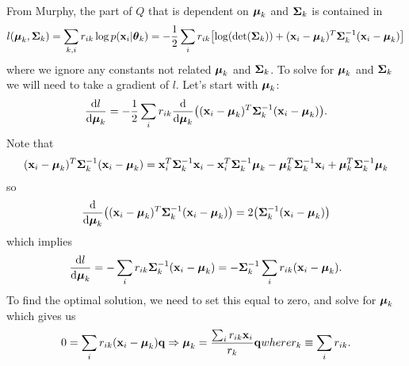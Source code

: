 \documentclass[12pt,letterpaper,fleqn]{hmcpset}
\begin{document}
\begin{solution}
From Murphy, the part of $Q$ that is dependent on $\hbox{\boldmath$\mu$}_k$ and $\hbox{\boldmath$\Sigma$}_k$ is contained in 
\begin{align*}
l(\hbox{\boldmath$\mu$}_k, \hbox{\boldmath$\Sigma$}_k) = \sum_{k,i} r_{ik} \log p(\vb x_i | \hbox{\boldmath$\theta$}_k) = -\frac12 \sum_i r_{ik}\qty[\log({\hbox{det}} (\hbox{\boldmath$\Sigma$}_k) )+ (\vb x_i - \hbox{\boldmath$\mu$}_k)^T \hbox{\boldmath$\Sigma$}^{-1}_k (\vb x_i - \hbox{\boldmath$\mu$}_k)]
\end{align*}
where we ignore any constants not related $\hbox{\boldmath$\mu$}_k$ and $\hbox{\boldmath$\Sigma$}_k$. To solve for $\hbox{\boldmath$\mu$}_k$ and $\hbox{\boldmath$\Sigma$}_k$ we will need to take a gradient of $l$. Let's start with $\hbox{\boldmath$\mu$}_k$:
\begin{align*}
\dv{l}{\hbox{\boldmath$\mu$}_k} = -\frac12 \sum_i r_{ik} \dv{\hbox{\boldmath$\mu$}_k}\qty((\vb x_i - \hbox{\boldmath$\mu$}_k)^T \hbox{\boldmath$\Sigma$}^{-1}_k (\vb x_i - \hbox{\boldmath$\mu$}_k)).
\end{align*}
Note that 
\begin{align*}
(\vb x_i - \hbox{\boldmath$\mu$}_k)^T \hbox{\boldmath$\Sigma$}^{-1}_k (\vb x_i - \hbox{\boldmath$\mu$}_k) =  \vb x_i^T \hbox{\boldmath$\Sigma$}^{-1}_k \vb x_i - \vb x_i^T \hbox{\boldmath$\Sigma$}^{-1}_k \hbox{\boldmath$\mu$}_k - \hbox{\boldmath$\mu$}_k^T \hbox{\boldmath$\Sigma$}^{-1}_k \vb x_i + \hbox{\boldmath$\mu$}_k^T \hbox{\boldmath$\Sigma$}^{-1}_k \hbox{\boldmath$\mu$}_k
\end{align*}
so
\begin{align*}
\dv{\hbox{\boldmath$\mu$}_k}\qty((\vb x_i - \hbox{\boldmath$\mu$}_k)^T \hbox{\boldmath$\Sigma$}^{-1}_k (\vb x_i - \hbox{\boldmath$\mu$}_k)) =  2 \qty(\hbox{\boldmath$\Sigma$}_k^{-1}(\vb x_i - \hbox{\boldmath$\mu$}_k))
\end{align*}
which implies
\begin{align*}
\dv{l}{\hbox{\boldmath$\mu$}_k} = - \sum_i r_{ik} \hbox{\boldmath$\Sigma$}_k^{-1}(\vb x_i - \hbox{\boldmath$\mu$}_k) = - \hbox{\boldmath$\Sigma$}_k^{-1} \sum_i r_{ik} (\vb x_i - \hbox{\boldmath$\mu$}_k).
\end{align*}
To find the optimal solution, we need to set this equal to zero, and solve for $\hbox{\boldmath$\mu$}_k$ which gives us
\begin{align*}
0 = \sum_i r_{ik} (\vb x_i - \hbox{\boldmath$\mu$}_k) {\bf q}{} \Rightarrow \hbox{\boldmath$\mu$}_k = \frac{\sum_i r_{ik} \vb x_i}{r_k} {\bf q}{where} r_k \equiv \sum_i r_{ik}.
\end{align*}



\end{solution}
\end{document}
